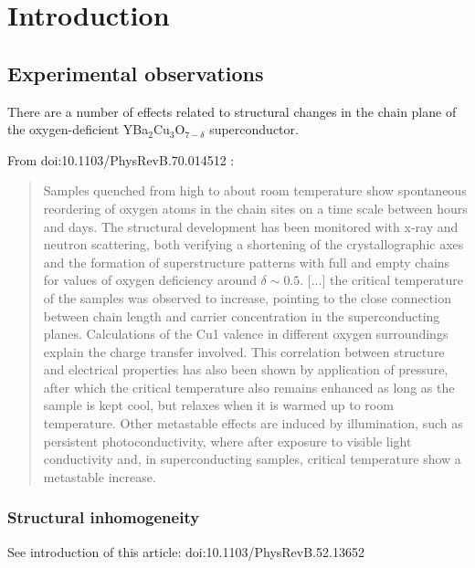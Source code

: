 \chapter{Introduction}

\section{Experimental observations}

There are a number of effects related to structural changes in the chain plane of the oxygen-deficient YBa$_{2}$Cu$_{3}$O$_{7-\delta}$ superconductor. 

From doi:10.1103\slash PhysRevB.70.014512 :

\begin{quote}
Samples quenched from high to about room temperature show spontaneous reordering of oxygen atoms in the chain sites on a time scale between hours and days. The structural development has been monitored with x-ray and neutron scattering, both verifying a shortening of the crystallographic axes and the formation of superstructure patterns with full and empty chains for values of oxygen deficiency around $\delta \sim  0.5$. [...] the critical temperature of the samples was observed to increase, pointing to the close connection between chain length and carrier concentration in the superconducting planes. Calculations of the Cu1 valence in different oxygen surroundings explain the charge transfer involved. This correlation between structure and electrical properties has also been shown by application of pressure, after which the critical temperature also remains enhanced as long as the sample is kept cool, but relaxes when it is warmed up to room temperature. Other metastable effects are induced by illumination, such as persistent photoconductivity, where after exposure to visible light conductivity and, in superconducting samples, critical temperature show a metastable increase.
\end{quote}

\subsection{Structural inhomogeneity}

See introduction of this article: doi:10.1103/PhysRevB.52.13652 

